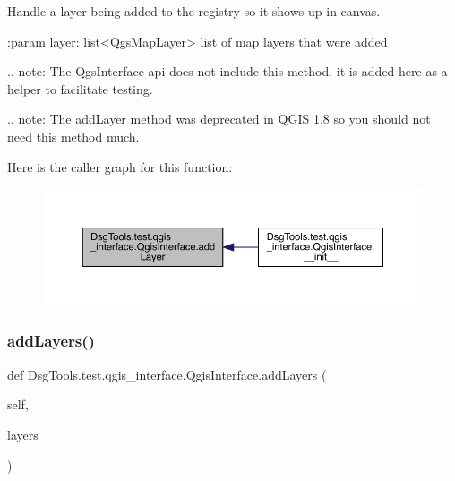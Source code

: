 \begin{DoxyVerb}Handle a layer being added to the registry so it shows up in canvas.

:param layer: list<QgsMapLayer> list of map layers that were added

.. note: The QgsInterface api does not include this method, it is added
 here as a helper to facilitate testing.

.. note: The addLayer method was deprecated in QGIS 1.8 so you should
 not need this method much.
\end{DoxyVerb}
 Here is the caller graph for this function\+:
\nopagebreak
\begin{figure}[H]
\begin{center}
\leavevmode
\includegraphics[width=350pt]{class_dsg_tools_1_1test_1_1qgis__interface_1_1_qgis_interface_af2c8f477fd5f365124ed2008e7711aa2_icgraph}
\end{center}
\end{figure}
\mbox{\label{class_dsg_tools_1_1test_1_1qgis__interface_1_1_qgis_interface_a79e022db1fda34569e5b5f7f9e6b5d3a}} 
\subsubsection{\texorpdfstring{add\+Layers()}{addLayers()}}
{\footnotesize\ttfamily def Dsg\+Tools.\+test.\+qgis\+\_\+interface.\+Qgis\+Interface.\+add\+Layers (\begin{DoxyParamCaption}\item[{}]{self,  }\item[{}]{layers }\end{DoxyParamCaption})}

